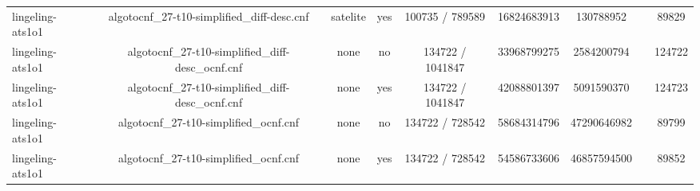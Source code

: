 \begin{appendices}
\begin{table}[p]
\begin{center}
\begin{tabular}{l|cccccccc}
  lingeling-ats1o1               & algotocnf\_27-t10-simplified\_diff-desc.cnf & satelite   & yes   & 100735 / 789589 & 16824683913 & 130788952 &            & 89829 \\ %
  lingeling-ats1o1               & algotocnf\_27-t10-simplified\_diff-desc\_ocnf.cnf & none       & no    & 134722 / 1041847 & 33968799275 & 2584200794 &            & 124722 \\ %
  lingeling-ats1o1               & algotocnf\_27-t10-simplified\_diff-desc\_ocnf.cnf & none       & yes   & 134722 / 1041847 & 42088801397 & 5091590370 &            & 124723 \\ %
  lingeling-ats1o1               & algotocnf\_27-t10-simplified\_ocnf.cnf & none       & no    & 134722 / 728542 & 58684314796 & 47290646982 &            & 89799 \\ %
  lingeling-ats1o1               & algotocnf\_27-t10-simplified\_ocnf.cnf & none       & yes   & 134722 / 728542 & 54586733606 & 46857594500 &            & 89852 \\ %
    \end{tabular}
  \end{center}
\end{table}

\newpage


\end{appendices}
